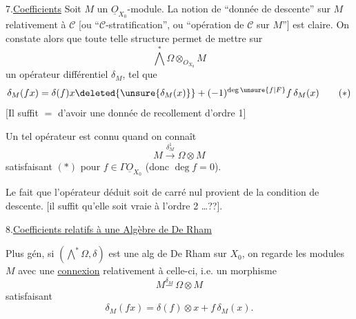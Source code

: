 7.\quad \uline{Coefficients}  Soit $M$ un $\underline O_{X_0}$-module. La notion de ``donnée de descente'' sur $M$ relativement à $\mathcal C$ [ou ``$\mathcal C$-stratification'', ou ``opération de $\mathcal C$ sur $M$''] est claire. On constate alors que toute telle structure permet de mettre sur
\[
\bigwedge^*\Omega\otimes_{O_{X_0}}M
\]
un opérateur différentiel $\delta_M$, tel que
\[
\delta_M(fx)=\delta(f)x\deleted{\unsure{\delta_M(x)}}+(-1)^{\deg\unsure{f|F}}f\,\delta_M(x)
\tag*{$(*)$}
\]
[Il suffit $=$ d'avoir une donnée de recollement d'ordre 1]

Un tel opérateur est connu quand on connaît
\[
M\xrightarrow{\delta_M^1}\Omega\otimes M
\]
satisfaisant $(*)$  pour $f\in\Gamma\underline O_{X_0}$ (donc $\deg f=0$).

Le fait que l'opérateur déduit  soit de carré nul provient de la condition de descente. [il suffit qu'elle soit vraie à l'ordre 2 \ldots??].

8.\quad \uline{Coefficients relatifs à une Algèbre de De Rham}

Plus gén, si $(\bigwedge^*\Omega,\delta)$ est une alg de De Rham sur $X_0$, on  regarde les modules $M$ avec une \uline{connexion} relativement à celle-ci, i.e. un morphisme
\[
M\overset{\delta_M}{\mathbin{-}}\ \Omega\otimes M
\]
satisfaisant
\[
\delta_M(fx)=\delta(f)\otimes x+f\,\delta_M(x).
\]


